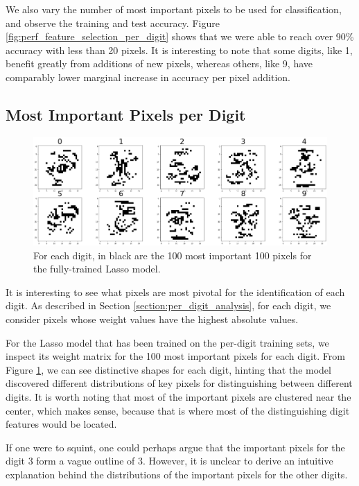 \documentclass[letterpaper, 10 pt, conference]{ieeeconf}  %
\begin{document}
We also vary the number of most important pixels to be used for classification, and observe the training and test accuracy. Figure \ref{fig:perf_feature_selection_per_digit} shows that we were able to reach over 90\% accuracy with less than 20 pixels. It is interesting to note that some digits, like 1, benefit greatly from additions of new pixels, whereas others, like 9, have comparably lower marginal increase in accuracy per pixel addition.

\subsection{Most Important Pixels per Digit}
\begin{figure}[t!] 
\centering
\includegraphics[width=\textwidth]{images/important_pixels_per_digit.png}
\caption{For each digit, in black are the 100 most important 100 pixels for the fully-trained Lasso model.}
\label{fig:important_pixels_per_digit}
\end{figure}

It is interesting to see what pixels are most pivotal for the identification of each digit. As described in Section
\ref{section:per_digit_analysis}, for each digit, we consider pixels whose weight values have the highest absolute values.

For the Lasso model that has been trained on the per-digit training sets, we inspect its weight matrix for the 100 most important pixels for each digit. From Figure \ref{fig:important_pixels_per_digit}, we can see distinctive shapes for each digit, hinting that the model discovered different distributions of key pixels for distinguishing between different digits. It is worth noting that most of the important pixels are clustered near the center, which makes sense, because that is where most of the distinguishing digit features would be located.

If one were to squint, one could perhaps argue that the important pixels for the digit 3 form a vague outline of 3. However, it is unclear to derive an intuitive explanation behind the distributions of the important pixels for the other digits. 
\end{document}
